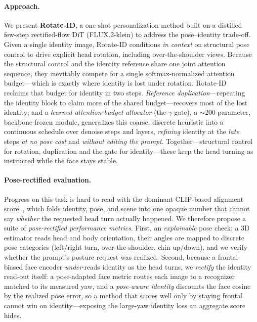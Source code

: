 \paragraph{Approach.}
We present \textbf{Rotate-ID}, a one-shot personalization method built on a distilled few-step rectified-flow DiT (FLUX.2-klein) to address the pose--identity trade-off. Given a single identity image, Rotate-ID conditions \emph{in context} on structural pose control to drive explicit head rotation, including over-the-shoulder views. Because the structural control and the identity reference share one joint attention sequence, they inevitably compete for a single softmax-normalized attention budget---which is exactly where identity is lost under rotation. Rotate-ID reclaims that budget for identity in two steps. \emph{Reference duplication}---repeating the identity block to claim more of the shared budget---recovers most of the lost identity; and a \emph{learned attention-budget allocator} (the $\gamma$-gate), a $\sim$200-parameter, backbone-frozen module, generalizes this coarse, discrete heuristic into a continuous schedule over denoise steps and layers, \emph{refining} identity at the \emph{late} steps \emph{at no pose cost} and \emph{without editing the prompt}. Together---structural control for rotation, duplication and the gate for identity---these keep the head turning as instructed while the face stays stable.

\paragraph{Pose-rectified evaluation.} Progress on this task is hard to read with the dominant CLIP-based alignment score~\cite{clipscore}, which folds identity, pose, and scene into one opaque number that cannot say \emph{whether} the requested head turn actually happened. We therefore propose a suite of \emph{pose-rectified performance metrics}. First, an \emph{explainable} pose check: a 3D estimator reads head and body orientation, their angles are mapped to discrete pose categories (left/right turn, over-the-shoulder, chin up/down), and we verify whether the prompt's posture request was realized. Second, because a frontal-biased face encoder \emph{under}-reads identity as the head turns, we \emph{rectify} the identity read-out itself: a pose-adapted face metric routes each image to a recognizer matched to its measured yaw, and a \emph{pose-aware identity} discounts the face cosine by the realized pose error, so a method that scores well only by staying frontal cannot win on identity---exposing the large-yaw identity loss an aggregate score hides.

